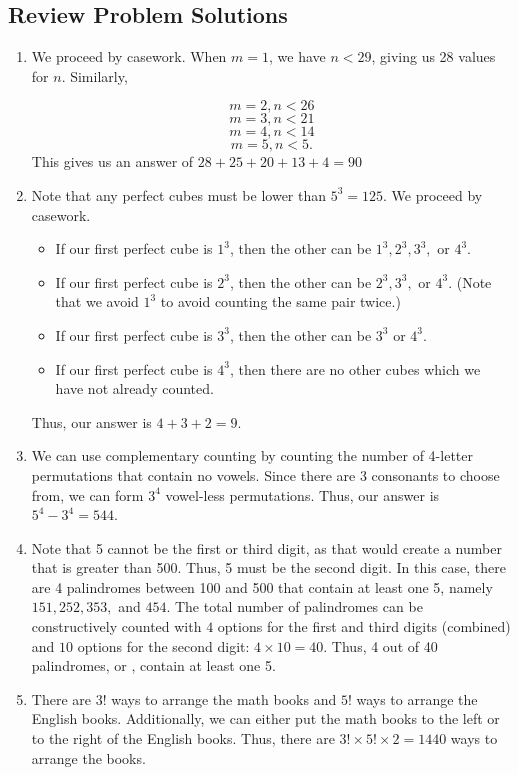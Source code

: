 \documentclass[12pt, letterpaper]{article}
\begin{document}
\newpage
\subsection{Review Problem Solutions}

\begin{enumerate}
    \item We proceed by casework. When $m=1$, we have $n < 29$, giving us 28 values for $n$. Similarly,

        $$m=2, n < 26$$
        $$m=3, n < 21$$
        $$m=4, n < 14$$
        $$m=5, n < 5.$$
    This gives us an answer of $28+25+20+13+4=\boxed{90}$
    \item Note that any perfect cubes must be lower than $5^3=125$. We proceed by casework.
    \begin{itemize}
        \item If our first perfect cube is $1^3$, then the other can be $1^3, 2^3, 3^3,$ or $4^3$.
        \item If our first perfect cube is $2^3$, then the other can be $2^3, 3^3,$ or $4^3$. (Note that we avoid $1^3$ to avoid counting the same pair twice.)
        \item If our first perfect cube is $3^3$, then the other can be $3^3$ or $4^3$.
        \item If our first perfect cube is $4^3$, then there are no other cubes which we have not already counted.
    \end{itemize}
    Thus, our answer is $4+3+2=\boxed{9}$.
    \item We can use complementary counting by counting the number of 4-letter permutations that contain no vowels. Since there are 3 consonants to choose from, we can form $3^4$ vowel-less permutations. Thus, our answer is $5^4-3^4 = \boxed{544}$.
    \item Note that 5 cannot be the first or third digit, as that would create a number that is greater than 500. Thus, 5 must be the second digit. In this case, there are 4 palindromes between 100 and 500 that contain at least one 5, namely $151, 252, 353,$ and $454$.
    The total number of palindromes can be constructively counted with $4$ options for the first and third digits (combined) and $10$ options for the second digit: $4 \times 10 = 40$. Thus, 4 out of 40 palindromes, or , contain at least one 5.
    \item There are $3!$ ways to arrange the math books and $5!$ ways to arrange the English books. Additionally, we can either put the math books to the left or to the right of the English books. Thus, there are $3! \times 5! \times 2 = \boxed{1440}$ ways to arrange the books.
\end{enumerate}
\end{document}
